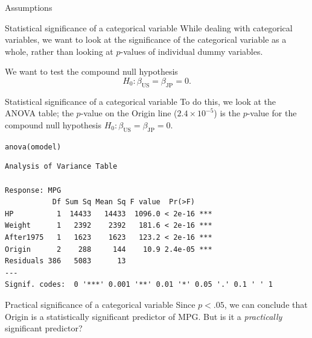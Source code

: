 \documentclass{beamer}\usepackage[]{graphicx}\usepackage[]{color}
\makeatletter
\newcommand{\hlstd}[1]{\textcolor[rgb]{1,0.894,0.769}{#1}}%
\newcommand{\hlkwd}[1]{\textcolor[rgb]{1,0.78,0.769}{#1}}%
\newenvironment{kframe}{%
 \def\at@end@of@kframe{}%
 \ifinner\ifhmode%
  \def\at@end@of@kframe{\end{minipage}}%
  \begin{minipage}{\columnwidth}%
 \fi\fi%
 \def\FrameCommand##1{\hskip\@totalleftmargin \hskip-\fboxsep
 \colorbox{shadecolor}{##1}\hskip-\fboxsep
     \hskip-\linewidth \hskip-\@totalleftmargin \hskip\columnwidth}%
 \MakeFramed {\advance\hsize-\width
   \@totalleftmargin\z@ \linewidth\hsize
   \@setminipage}}%
 {\par\unskip\endMakeFramed%
 \at@end@of@kframe}
\newenvironment{knitrout}{}{} %
\makeatother
\begin{document}
\begin{darkframes}
\begin{frame}[fragile]{Assumptions}
\begin{knitrout}
\end{knitrout}
      
      \end{frame}

      \begin{frame}[fragile]{Statistical significance of a categorical variable}
        While dealing with categorical variables, we want to look at the significance of the categorical variable as a whole, rather than looking at $p$-values of individual dummy variables.

        \bigskip\pause

        We want to test the \alert{compound null hypothesis} 
        \[
          H_0 : \beta_{\text{US}} = \beta_{\text{JP}} = 0.
        \]
      \end{frame}
      
      \begin{frame}[fragile]{Statistical significance of a categorical variable}
        To do this, we look at the ANOVA table; the $p$-value on the Origin line ($2.4 \times 10^{-5}$) is the $p$-value for the compound null hypothesis $H_0 : \beta_{\text{US}} = \beta_{\text{JP}} = 0$.
        \fontsize{9}{9}\selectfont
\begin{knitrout}
\begin{kframe}
\begin{alltt}
\hlkwd{anova}\hlstd{(omodel)}
\end{alltt}
\begin{verbatim}
Analysis of Variance Table

Response: MPG
           Df Sum Sq Mean Sq F value  Pr(>F)    
HP          1  14433   14433  1096.0 < 2e-16 ***
Weight      1   2392    2392   181.6 < 2e-16 ***
After1975   1   1623    1623   123.2 < 2e-16 ***
Origin      2    288     144    10.9 2.4e-05 ***
Residuals 386   5083      13                    
---
Signif. codes:  0 '***' 0.001 '**' 0.01 '*' 0.05 '.' 0.1 ' ' 1
\end{verbatim}
\end{kframe}
\end{knitrout}
      \end{frame}
      
      \begin{frame}{Practical significance of a categorical variable}
        Since $p<.05$, we can conclude that Origin is a statistically significant predictor of MPG.
        But is it a \emph{practically} significant predictor?
        

\end{frame}
\end{darkframes}
\end{document}
